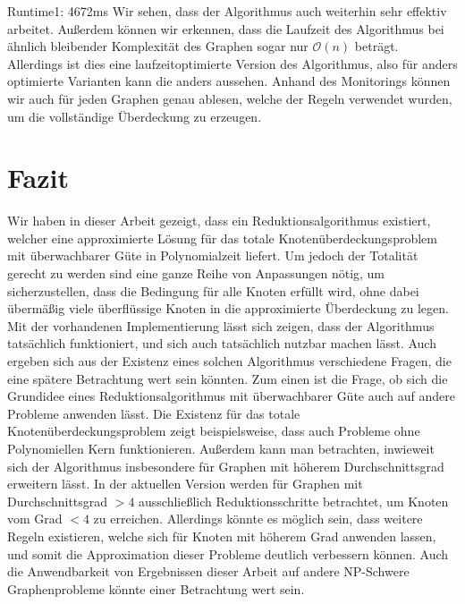 \documentclass[12pt,onecolumn, notitlepage]{scrartcl}
\begin{document}
 Runtime1: 4672ms \newline \newline 
 Wir sehen, dass der Algorithmus auch weiterhin sehr effektiv arbeitet. Außerdem können wir erkennen, dass die Laufzeit des Algorithmus bei ähnlich bleibender Komplexität des Graphen sogar nur $\mathcal O(n)$ beträgt. Allerdings ist dies eine laufzeitoptimierte Version des Algorithmus, also für anders optimierte Varianten kann die anders aussehen.\newline 
Anhand des Monitorings können wir auch für jeden Graphen genau ablesen, welche der Regeln verwendet wurden, um die vollständige Überdeckung zu erzeugen.\newline 
\section{Fazit}
Wir haben in dieser Arbeit gezeigt, dass ein Reduktionsalgorithmus existiert, welcher eine approximierte Lösung für das totale Knotenüberdeckungsproblem mit überwachbarer Güte in Polynomialzeit liefert. Um jedoch der Totalität gerecht zu werden sind eine ganze Reihe von Anpassungen nötig, um sicherzustellen, dass die Bedingung für alle Knoten erfüllt wird, ohne dabei übermäßig viele überflüssige Knoten in die approximierte Überdeckung zu legen. Mit der vorhandenen Implementierung lässt sich zeigen, dass der Algorithmus tatsächlich funktioniert, und sich auch tatsächlich nutzbar machen lässt. \newline 
Auch ergeben sich aus der Existenz eines solchen Algorithmus verschiedene Fragen, die eine spätere Betrachtung wert sein könnten.\newline 
Zum einen ist die Frage, ob sich die Grundidee eines Reduktionsalgorithmus mit überwachbarer Güte auch auf andere Probleme anwenden lässt. Die Existenz für das totale Knotenüberdeckungsproblem zeigt beispielsweise, dass auch Probleme ohne Polynomiellen Kern funktionieren.\newline 
Außerdem kann man betrachten, inwieweit sich der Algorithmus insbesondere für Graphen mit höherem Durchschnittsgrad erweitern lässt. In der aktuellen Version werden für Graphen mit Durchschnittsgrad $>4$ ausschließlich Reduktionsschritte betrachtet, um Knoten vom Grad $<4$ zu erreichen. Allerdings könnte es möglich sein, dass weitere Regeln existieren, welche sich für Knoten mit höherem Grad anwenden lassen, und somit die Approximation dieser Probleme deutlich verbessern können.\newline 
Auch die Anwendbarkeit von Ergebnissen dieser Arbeit auf andere NP-Schwere Graphenprobleme könnte einer Betrachtung wert sein.
\end{document}
